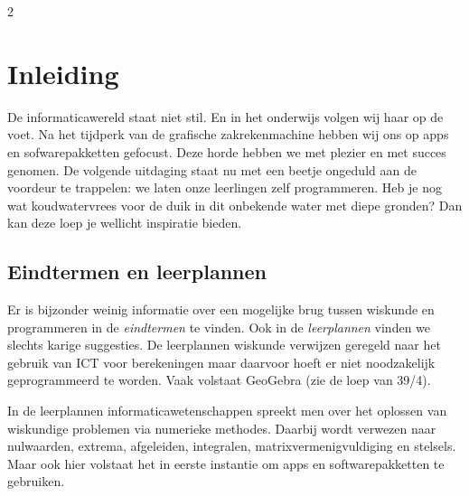 
\startcontents[inhoudloep]	%

\begin{multicols}{2}
	\inhoudstafelloep	
	
    \section{Inleiding}
    
    De informaticawereld staat niet stil. En in het onderwijs volgen wij haar op de voet. Na het tijdperk van de grafische zakrekenmachine hebben wij ons op apps en sofwarepakketten gefocust. Deze horde hebben we met plezier en met succes genomen. De volgende uitdaging staat nu met een beetje ongeduld aan de voordeur te trappelen: we laten onze leerlingen zelf programmeren. Heb je nog wat koudwatervrees voor de duik in dit onbekende water met diepe gronden? Dan kan deze loep je wellicht inspiratie bieden. 
    \vfill\null
    \columnbreak
    \subsection{Eindtermen en leerplannen}
    
    Er is bijzonder weinig informatie over een mogelijke brug tussen wiskunde en programmeren in de \emph{eindtermen} te vinden. Ook in de \emph{leerplannen} vinden we slechts karige suggesties. De leerplannen wiskunde verwijzen geregeld naar het gebruik van ICT voor berekeningen maar daarvoor hoeft er niet noodzakelijk geprogrammeerd te worden. Vaak volstaat GeoGebra (zie de loep van 39/4). 

    In de leerplannen informaticawetenschappen spreekt men over het oplossen van wiskundige problemen via numerieke methodes. Daarbij wordt verwezen naar nulwaarden, extrema, afgeleiden, integralen,  matrixvermenigvuldiging en stelsels. Maar ook hier volstaat het in eerste instantie om apps en softwarepakketten te gebruiken.
    

\end{multicols}
